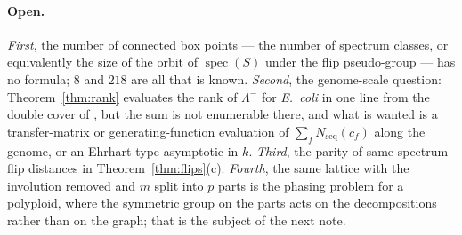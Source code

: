 \documentclass[11pt]{article}
\theoremstyle{plain}
\theoremstyle{definition}
\theoremstyle{remark}
\newcommand{\spec}{\operatorname{spec}}
\newcommand{\Nseq}{N_{\mathrm{seq}}}
\newcommand{\Lm}{\Lambda^{-}}
\begin{document}
\paragraph{Open.} \emph{First}, the number of connected box points --- the number of spectrum
classes, or equivalently the size of the orbit of $\spec(S)$ under the flip pseudo-group ---
has no formula; $8$ and $218$ are all that is known. \emph{Second}, the genome-scale question:
Theorem~\ref{thm:rank} evaluates the rank of $\Lm$ for \emph{E.\ coli} in one line from the
double cover of \cite{Bio6}, but the sum is not enumerable there, and what is wanted is a
transfer-matrix or generating-function evaluation of $\sum_f\Nseq(c_f)$ along the genome, or
an Ehrhart-type asymptotic in $k$. \emph{Third}, the parity of same-spectrum flip distances in
Theorem~\ref{thm:flips}(c). \emph{Fourth}, the same lattice with the involution removed and
$m$ split into $p$ parts is the phasing problem for a polyploid, where the symmetric group on
the parts acts on the decompositions rather than on the graph; that is the subject of the next
note.
\end{document}

